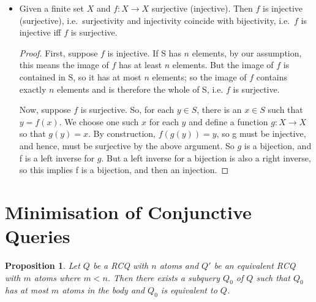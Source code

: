 \documentclass[a4paper,12pt]{article}
\newtheorem{prop}{Proposition}
\begin{document}
\begin{itemize}
{\begin{proof}
Let $z \in Z$ be arbitrary and $x \in X$ such that $g(f(x)) = z$ (by surjectivity of $g \circ f$). Hence, we can find some $f(x) = y \in Y$ such that $g(y) = z$. So $g$ is surjective.
\end{proof}

Given $g \circ f$ surjective. Then $f$ is surjective.

\begin{proof}
Assume to the contrary that $f$ is not surjective. Then, there is $y \in Y$ such that there is no $x \in X$ with $f(x) = y$. This means that there is no $y \in Y$ such that $z \in Z$ with $g(y) = z$, which contradicts that $g$ is surjective (see previous proof).
\end{proof}
}
\item{
Given a finite set $X$ and $f : X \rightarrow X$ surjective (injective). Then $f$ is injective (surjective), i.e.\ surjectivity and injectivity coincide with bijectivity, i.e.\ $f$ is injective iff $f$ is surjective.
\begin{proof}
 First, suppose $f$ is injective. If S has $n$ elements, by our assumption, this means the image of $f$ has at least $n$ elements. But the image of $f$ is contained in S, so it has at most $n$ elements; so the image of $f$ contains exactly $n$ elements and is therefore the whole of S, i.e. $f$ is surjective.

Now, suppose $f$ is surjective. So, for each $y \in S$, there is an $x \in S$ such that $y=f(x)$. We choose one such $x$ for each $y$ and define a function $g:X \rightarrow X$ so that $g(y)=x$. By construction, $f(g(y))=y$, so g must be injective, and hence, must be surjective by the above argument. So $g$ is a bijection, and f is a left inverse for $g$. But a left inverse for a bijection is also a right inverse, so this implies f is a bijection, and then an injection.
\end{proof}
}
\end{itemize}

\section{Minimisation of Conjunctive Queries}


\begin{prop} Let $Q$ be a RCQ with $n$ atoms and $Q'$ be an equivalent RCQ with $m$ atoms where $m < n$. Then there exists a subquery $Q_0$ of $Q$ such that $Q_0$ has at most $m$ atoms in the body and $Q_0$ is equivalent to $Q$.
\end{prop}
\end{document}
